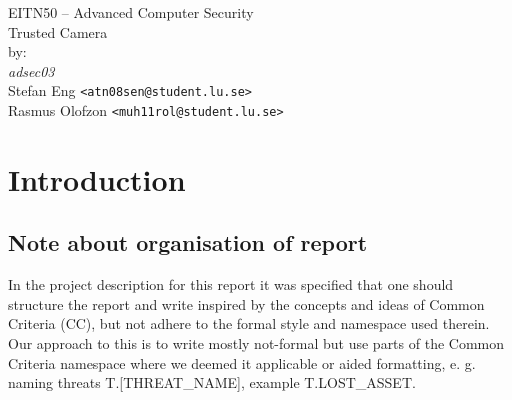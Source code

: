 \documentclass[10pt]{article}
\begin{document}

  \thispagestyle{empty}
  \vspace*{3cm}
  \begin{center}
    \huge{EITN50 -- Advanced Computer Security} \\
    \vspace{0.3cm}
    \LARGE{Trusted Camera} \\
    \vspace{1cm}
    \large{by: \\ \vspace{0.2cm}
	\textit{adsec03} \\
        Stefan Eng \texttt{<atn08sen@student.lu.se>} \\
        Rasmus Olofzon \texttt{<muh11rol@student.lu.se>}
        } \\
  \end{center}


  \newpage

  \section{Introduction}



    \subsection{Note about organisation of report}
      { \footnotesize In the project description for this report it was specified that one should
      structure the report and write inspired by the concepts and ideas of Common Criteria (CC),
	but not adhere to the formal style and namespace used therein.
	Our approach to this is to write mostly not-formal but use parts of
	the Common Criteria namespace where we deemed it applicable or aided formatting,
	e. g. naming threats T.[THREAT\_NAME], example T.LOST\_ASSET. }
\end{document}
